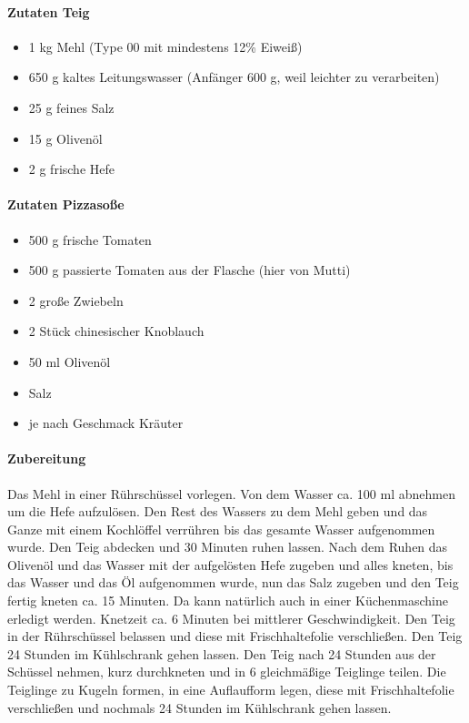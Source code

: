 \paragraph{Zutaten Teig}

\begin{itemize}[noitemsep]
	\item 1 kg Mehl (Type 00 mit mindestens 12\% Eiweiß)
	\item 650 g kaltes Leitungswasser (Anfänger 600 g, weil leichter zu 
	verarbeiten)
	\item 25 g feines Salz
	\item 15 g Olivenöl
	\item 2 g frische Hefe
\end{itemize} 

\paragraph{Zutaten Pizzasoße}
 
\begin{itemize}[noitemsep]
	\item 500 g frische Tomaten
	\item 500 g passierte Tomaten aus der Flasche (hier von Mutti)
	\item 2 große Zwiebeln
	\item 2 Stück chinesischer Knoblauch
	\item 50 ml Olivenöl
	\item Salz
	\item je nach Geschmack Kräuter
\end{itemize}

\paragraph{Zubereitung }
Das Mehl in einer Rührschüssel vorlegen. Von dem Wasser ca. 100 ml 
abnehmen um die Hefe aufzulösen. Den Rest des Wassers zu dem Mehl 
geben 
und das Ganze mit einem Kochlöffel verrühren bis das gesamte Wasser 
aufgenommen wurde. Den Teig  abdecken und 30 Minuten ruhen lassen. Nach 
dem Ruhen das Olivenöl und das Wasser mit der aufgelösten Hefe zugeben und 
alles kneten, bis das Wasser und das Öl aufgenommen wurde, nun das Salz 
zugeben und den Teig fertig kneten ca. 15 Minuten. Da kann natürlich auch in 
einer Küchenmaschine erledigt werden. Knetzeit ca. 6 Minuten bei mittlerer 
Geschwindigkeit.
Den Teig in der Rührschüssel belassen und diese mit Frischhaltefolie 
verschließen. Den Teig 24 Stunden im Kühlschrank gehen lassen. Den Teig 
nach 24 Stunden aus der Schüssel nehmen, kurz durchkneten und in 6 
gleichmäßige Teiglinge teilen. Die Teiglinge zu Kugeln formen, in eine 
Auflaufform legen, diese mit Frischhaltefolie verschließen und nochmals 24 
Stunden im Kühlschrank gehen lassen. 


